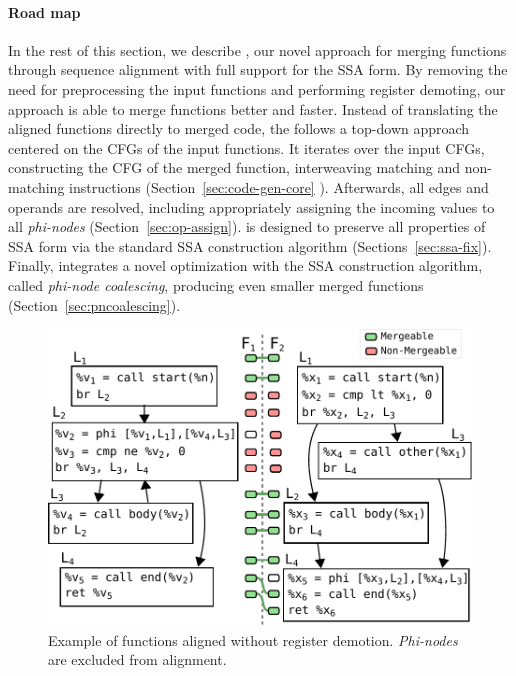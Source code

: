 \paragraph*{Road map} In the rest of this section, we describe {\ProjName}, our novel approach for merging functions through sequence alignment with full
support for the SSA form. By removing the need for preprocessing the input functions and performing register demoting, our approach is able
to merge functions better and faster. Instead of translating the aligned functions directly to merged code, the {\ProjName} follows a
top-down approach centered on the CFGs of the input functions. It iterates over the input CFGs, constructing the
CFG of the merged function, interweaving matching and non-matching instructions (Section~\ref{sec:code-gen-core}
). Afterwards, all edges and operands are resolved, including appropriately assigning the incoming values to all \textit{phi-nodes} (Section~\ref{sec:op-assign}).
{\ProjName} is designed to preserve all properties of SSA form via the standard SSA construction algorithm (Sections~\ref{sec:ssa-fix}).
Finally, {\ProjName} integrates a novel optimization with the SSA construction algorithm, called \textit{phi-node coalescing}, producing even smaller merged functions (Section~\ref{sec:pncoalescing}).

\begin{figure}[t!]
  \centering
  \includegraphics[scale=0.55]{src/merge-operation/figs/code-gen-cfg-input.pdf}
    \caption{Example of functions aligned without register demotion.
    \textit{Phi-nodes} are excluded from alignment.}
  \label{fig:code-gen-cfg-input}
\end{figure}

